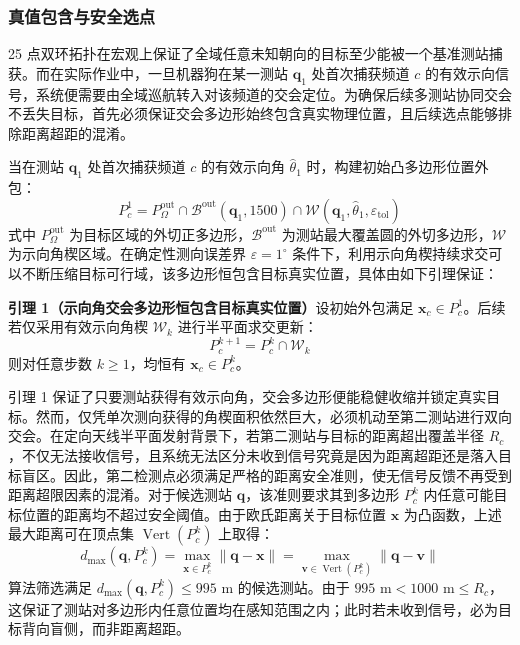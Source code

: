 \documentclass[zihao=-4,a4paper,UTF8]{ctexart}
\begin{document}
\subsubsection{真值包含与安全选点}

25 点双环拓扑在宏观上保证了全域任意未知朝向的目标至少能被一个基准测站捕获。而在实际作业中，一旦机器狗在某一测站 $\mathbf{q}_1$ 处首次捕获频道 $c$ 的有效示向信号，系统便需要由全域巡航转入对该频道的交会定位。为确保后续多测站协同交会不丢失目标，首先必须保证交会多边形始终包含真实物理位置，且后续选点能够排除距离超距的混淆。

当在测站 $\mathbf{q}_1$ 处首次捕获频道 $c$ 的有效示向角 $\hat{\theta}_1$ 时，构建初始凸多边形位置外包：
\begin{equation}
    P_c^1 = P_{\Omega}^{\mathrm{out}} \cap \mathcal{B}^{\mathrm{out}}(\mathbf{q}_1, 1500) \cap \mathcal{W}(\mathbf{q}_1, \hat{\theta}_1, \varepsilon_{\mathrm{tol}})
\end{equation}
式中 $P_{\Omega}^{\mathrm{out}}$ 为目标区域的外切正多边形，$\mathcal{B}^{\mathrm{out}}$ 为测站最大覆盖圆的外切多边形，$\mathcal{W}$ 为示向角楔区域。在确定性测向误差界 $\varepsilon = 1^\circ$ 条件下，利用示向角楔持续求交可以不断压缩目标可行域，该多边形恒包含目标真实位置，具体由如下引理保证：

\noindent\textbf{引理 1（示向角交会多边形恒包含目标真实位置）}\quad 设初始外包满足 $\mathbf{x}_c \in P_c^1$。后续若仅采用有效示向角楔 $\mathcal{W}_k$ 进行半平面求交更新：
\begin{equation}
    P_c^{k+1} = P_c^k \cap \mathcal{W}_k
\end{equation}
则对任意步数 $k \ge 1$，均恒有 $\mathbf{x}_c \in P_c^k$。

引理 1 保证了只要测站获得有效示向角，交会多边形便能稳健收缩并锁定真实目标。然而，仅凭单次测向获得的角楔面积依然巨大，必须机动至第二测站进行双向交会。在定向天线半平面发射背景下，若第二测站与目标的距离超出覆盖半径 $R_c$，不仅无法接收信号，且系统无法区分未收到信号究竟是因为距离超距还是落入目标盲区。因此，第二检测点必须满足严格的距离安全准则，使无信号反馈不再受到距离超限因素的混淆。对于候选测站 $\mathbf{q}$，该准则要求其到多边形 $P_c^k$ 内任意可能目标位置的距离均不超过安全阈值。由于欧氏距离关于目标位置 $\mathbf{x}$ 为凸函数，上述最大距离可在顶点集 $\operatorname{Vert}(P_c^k)$ 上取得：
\begin{equation}
    d_{\max}(\mathbf{q}, P_c^k) = \max_{\mathbf{x} \in P_c^k} \|\mathbf{q} - \mathbf{x}\| = \max_{\mathbf{v} \in \operatorname{Vert}(P_c^k)} \|\mathbf{q} - \mathbf{v}\|
\end{equation}
算法筛选满足 $d_{\max}(\mathbf{q}, P_c^k) \le 995\text{ m}$ 的候选测站。由于 $995\text{ m} < 1000\text{ m} \le R_c$，这保证了测站对多边形内任意位置均在感知范围之内；此时若未收到信号，必为目标背向盲侧，而非距离超距。
\end{document}
